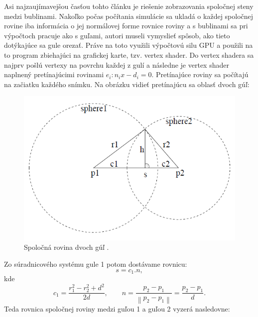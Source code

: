 Asi najzaujímavejšou časťou tohto článku je riešenie zobrazovania spoločnej steny medzi bublinami. Nakoľko počas počítania simulácie sa ukladá o každej spoločnej rovine iba informácia o jej normálovej forme rovnice roviny a s bublinami sa pri výpočtoch pracuje ako s guľami, autori museli vymyslieť spôsob, ako tieto dotýkajúce sa gule orezať. Práve na toto využili výpočtovú silu GPU a použili na to program zbiehajúci na grafickej karte, tzv. vertex shader. Do vertex shadera sa najprv pošlú vertexy na povrchu každej z gulí a následne je vertex shader naplnený pretínajúcimi rovinami $e_{i}: n_{i}x - d_{i} = 0$. Pretínajúce roviny sa počítajú na začiatku každého snímku. Na obrázku  vidieť pretínajúcu sa oblasť dvoch gúľ:
\begin{figure}[H]
	\begin{center}
		\includegraphics[height=\imageHeight]{images/sunkel/cross_section_of_two_spheres}
		\caption{Spoločná rovina dvoch gúľ \cite{sunkel2004}.}
		\label{img:cross_section_of_two_spheres}
	\end{center}
\end{figure}
\noindent Zo súradnicového systému gule 1 potom dostávame rovnicu:
\begin{equation}
	\label{eq:sunkel:s}
	s = c_{1}.n,
\end{equation}
kde
\begin{equation}
	\label{eq:sunkel:c1_n}
	c_{1} = \frac{r_{1}^{2} - r_{2}^{2} + d^{2}}{2d}, \qquad n = \frac{p_{2} - p_{1}}{\left \| p_{2} - p_{1} \right \|} = \frac{p_{2} - p_{1}}{d}.
\end{equation}
Teda rovnica spoločnej roviny medzi guľou 1 a guľou 2 vyzerá nasledovne:

